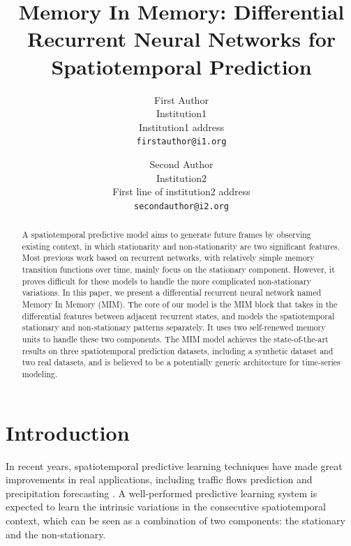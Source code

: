 \documentclass[10pt,twocolumn,letterpaper]{article}
\begin{document}
\title{Memory In Memory: Differential Recurrent Neural Networks for\\ Spatiotemporal Prediction}

\author{First Author\\
Institution1\\
Institution1 address\\
{\tt\small firstauthor@i1.org}
\and
Second Author\\
Institution2\\
First line of institution2 address\\
{\tt\small secondauthor@i2.org}
}

\maketitle

\begin{abstract}
   A spatiotemporal predictive model aims to generate future frames by observing existing context, in which stationarity and non-stationarity are two significant features. Most previous work based on recurrent networks, with relatively simple memory transition functions over time, mainly focus on the stationary component. However, it proves difficult for these models to handle the more complicated non-stationary variations. In this paper, we present a differential recurrent neural network named Memory In Memory (MIM). The core of our model is the MIM block that takes in the differential features between adjacent recurrent states, and models the spatiotemporal stationary and non-stationary patterns separately. It uses two self-renewed memory units to handle these two components. The MIM model achieves the state-of-the-art results on three spatiotemporal prediction datasets, including a synthetic dataset and two real datasets, and is believed to be a potentially generic architecture for time-series modeling.
\end{abstract}

\section{Introduction}
\label{sec:Introduction}
In recent years, spatiotemporal predictive learning techniques have made great improvements in real applications, including traffic flows prediction \citep{zhang2017deep} and precipitation forecasting \citep{shi2015convolutional,wang2017predrnn}. A well-performed predictive learning system is expected to learn the intrinsic variations in the consecutive spatiotemporal context, which can be seen as a combination of two components: the stationary and the non-stationary. 
\end{document}

